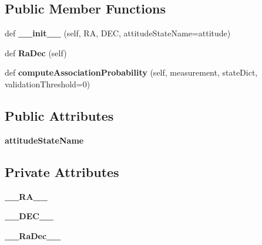\subsection*{Public Member Functions}
\begin{DoxyCompactItemize}
\item 
def {\bfseries \+\_\+\+\_\+init\+\_\+\+\_\+} (self, RA, D\+EC, attitude\+State\+Name=\textquotesingle{}attitude\textquotesingle{})\hypertarget{classSignals_1_1PointSource_a08c5c8fe52979814a725fac08b34c02f}{}\label{classSignals_1_1PointSource_a08c5c8fe52979814a725fac08b34c02f}

\item 
def {\bfseries Ra\+Dec} (self)\hypertarget{classSignals_1_1PointSource_a5fbb36eda0901536d77eff9a3262ae9e}{}\label{classSignals_1_1PointSource_a5fbb36eda0901536d77eff9a3262ae9e}

\item 
def {\bfseries compute\+Association\+Probability} (self, measurement, state\+Dict, validation\+Threshold=0)\hypertarget{classSignals_1_1PointSource_ab1389987fc68312eed77ae3126a21a2a}{}\label{classSignals_1_1PointSource_ab1389987fc68312eed77ae3126a21a2a}

\end{DoxyCompactItemize}
\subsection*{Public Attributes}
\begin{DoxyCompactItemize}
\item 
{\bfseries attitude\+State\+Name}\hypertarget{classSignals_1_1PointSource_a151f2600c3623d1ca49fb51feb8a1178}{}\label{classSignals_1_1PointSource_a151f2600c3623d1ca49fb51feb8a1178}

\end{DoxyCompactItemize}
\subsection*{Private Attributes}
\begin{DoxyCompactItemize}
\item 
{\bfseries \+\_\+\+\_\+\+R\+A\+\_\+\+\_\+}\hypertarget{classSignals_1_1PointSource_ab452ac8a968d9ac8759cb95f60424932}{}\label{classSignals_1_1PointSource_ab452ac8a968d9ac8759cb95f60424932}

\item 
{\bfseries \+\_\+\+\_\+\+D\+E\+C\+\_\+\+\_\+}\hypertarget{classSignals_1_1PointSource_a47e98573bcf62bb6e80f1bcbbdb79620}{}\label{classSignals_1_1PointSource_a47e98573bcf62bb6e80f1bcbbdb79620}

\item 
{\bfseries \+\_\+\+\_\+\+Ra\+Dec\+\_\+\+\_\+}\hypertarget{classSignals_1_1PointSource_ac876dc0b41dd3da6bb9b8ec9c41e0dd2}{}\label{classSignals_1_1PointSource_ac876dc0b41dd3da6bb9b8ec9c41e0dd2}

\end{DoxyCompactItemize}
